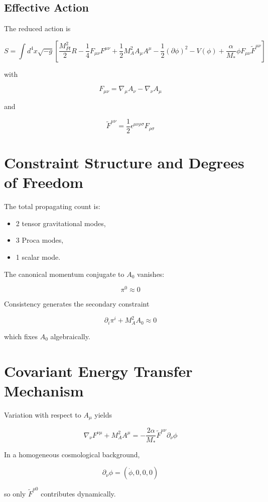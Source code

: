 \documentclass[11pt]{article}
\begin{document}
\subsection{Effective Action}

The reduced action is

\[
S
=
\int d^4x \sqrt{-g}
\left[
\frac{M_{Pl}^2}{2}R
-\frac14 F_{\mu\nu}F^{\mu\nu}
+\frac12 M_A^2 A_\mu A^\mu
-\frac12 (\partial\phi)^2
-V(\phi)
+\frac{\alpha}{M_*}\phi F_{\mu\nu}\tilde F^{\mu\nu}
\right]
\]

with

\[
F_{\mu\nu}
=
\nabla_\mu A_\nu
-
\nabla_\nu A_\mu
\]

and

\[
\tilde F^{\mu\nu}
=
\frac12
\epsilon^{\mu\nu\rho\sigma}
F_{\rho\sigma}
\]

\section{Constraint Structure and Degrees of Freedom}

The total propagating count is:

\begin{itemize}
\item 2 tensor gravitational modes,
\item 3 Proca modes,
\item 1 scalar mode.
\end{itemize}

The canonical momentum conjugate to \(A_0\) vanishes:

\[
\pi^0 \approx 0
\]

Consistency generates the secondary constraint

\[
\partial_i \pi^i + M_A^2 A_0 \approx 0
\]

which fixes \(A_0\) algebraically.

\section{Covariant Energy Transfer Mechanism}

Variation with respect to \(A_\mu\) yields

\[
\nabla_\nu F^{\nu\mu}
+
M_A^2 A^\mu
=
-
\frac{2\alpha}{M_*}
\tilde F^{\mu\nu}
\partial_\nu \phi
\]

In a homogeneous cosmological background,

\[
\partial_\nu \phi = (\dot\phi,0,0,0)
\]

so only \(\tilde F^{\mu 0}\) contributes dynamically.
\end{document}
